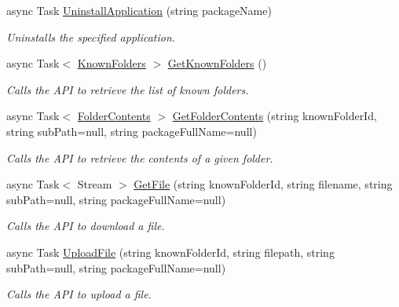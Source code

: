 \begin{DoxyCompactItemize}
async Task \hyperlink{class_microsoft_1_1_tools_1_1_windows_device_portal_1_1_device_portal_a2db34aba2e5ea8b8604198b08c62c826}{Uninstall\+Application} (string package\+Name)
\begin{DoxyCompactList}\small\item\em Uninstalls the specified application. \end{DoxyCompactList}\item 
async Task$<$ \hyperlink{class_microsoft_1_1_tools_1_1_windows_device_portal_1_1_device_portal_1_1_known_folders}{Known\+Folders} $>$ \hyperlink{class_microsoft_1_1_tools_1_1_windows_device_portal_1_1_device_portal_af0f11fa0fa119aaa5e46e3afea9ba06f}{Get\+Known\+Folders} ()
\begin{DoxyCompactList}\small\item\em Calls the A\+PI to retrieve the list of known folders. \end{DoxyCompactList}\item 
async Task$<$ \hyperlink{class_microsoft_1_1_tools_1_1_windows_device_portal_1_1_device_portal_1_1_folder_contents}{Folder\+Contents} $>$ \hyperlink{class_microsoft_1_1_tools_1_1_windows_device_portal_1_1_device_portal_a2f3ccc8c7137f651d7523845cef329bf}{Get\+Folder\+Contents} (string known\+Folder\+Id, string sub\+Path=null, string package\+Full\+Name=null)
\begin{DoxyCompactList}\small\item\em Calls the A\+PI to retrieve the contents of a given folder. \end{DoxyCompactList}\item 
async Task$<$ Stream $>$ \hyperlink{class_microsoft_1_1_tools_1_1_windows_device_portal_1_1_device_portal_a7a9addbe26dd12ae5fa6c55604d1efa1}{Get\+File} (string known\+Folder\+Id, string filename, string sub\+Path=null, string package\+Full\+Name=null)
\begin{DoxyCompactList}\small\item\em Calls the A\+PI to download a file. \end{DoxyCompactList}\item 
async Task \hyperlink{class_microsoft_1_1_tools_1_1_windows_device_portal_1_1_device_portal_a637b1462c57aa9f094e557acf31407e0}{Upload\+File} (string known\+Folder\+Id, string filepath, string sub\+Path=null, string package\+Full\+Name=null)
\begin{DoxyCompactList}\small\item\em Calls the A\+PI to upload a file. \end{DoxyCompactList}\item 

\end{DoxyCompactItemize}
